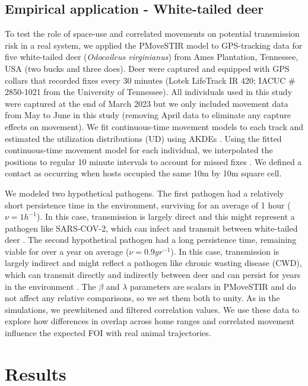 \documentclass[letterpaper]{article}
\begin{document}
\subsection*{Empirical application - White-tailed deer}

To test the role of space-use and correlated movements on potential transmission risk in a real system, we applied the PMoveSTIR model to GPS-tracking data for five white-tailed deer (\emph{Odocoileus virginianus}) from Ames Plantation, Tennessee, USA (two bucks and three does). 
Deer were captured and equipped with GPS collars that recorded fixes every 30 minutes (Lotek LifeTrack IR 420; IACUC \# 2850-1021 from the University of Tennessee).  All individuals used in this study were captured at the end of March 2023 but we only included movement data from May to June in this study (removing April data to eliminate any capture effects on movement).  We fit continuous-time movement models to each track and estimated the utilization distributions (UD) using AKDEs \citep{Calabrese2016}. Using the fitted continuous-time movement model for each individual, we interpolated the positions to regular 10 minute intervals to account for missed fixes \citep{Yang2023}.  We defined a contact as occurring when hosts occupied the same 10m by 10m square cell.  

We modeled two hypothetical pathogens. The first pathogen had a relatively short persistence time in the environment, surviving for an average of 1 hour  ($\nu=1 h^{-1}$). In this case, transmission is largely direct and this might represent a pathogen like SARS-COV-2, which can infect and transmit between white-tailed deer \citep{Hale2022}. The second hypothetical pathogen had a long persistence time, remaining viable for over a year on average ($\nu=0.9 yr^{-1}$). In this case, transmission is largely indirect and might reflect a pathogen like chronic wasting disease (CWD), which can transmit directly and indirectly between deer and can persist for years in the environment \citep{Saunders2012a}. The $\beta$ and $\lambda$ parameters are scalars in PMoveSTIR and do not affect any relative comparisons, so we set them both to unity. As in the simulations, we prewhitened and filtered correlation values. 
We use these data to explore how differences in overlap across home ranges and  correlated movement influence the expected FOI with real animal trajectories.

\section*{Results}
\end{document}
